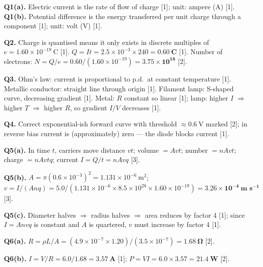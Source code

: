 \begin{markscheme}

\textbf{Q1(a).} Electric current is the rate of flow of charge [1]; unit: ampere (A) [1].\\
\textbf{Q1(b).} Potential difference is the energy transferred per unit charge through a component [1]; unit: volt (V) [1].

\vspace{0.5em}\textbf{Q2.} Charge is quantised means it only exists in discrete multiples of $e = 1.60\times10^{-19}\ \text{C}$ [1]. $Q = It = 2.5\times10^{-3} \times 240 = \mathbf{0.60\ \text{C}}$ [1]. Number of electrons: $N = Q/e = 0.60/(1.60\times10^{-19}) = \mathbf{3.75\times10^{18}}$ [2].

\vspace{0.5em}\textbf{Q3.} Ohm's law: current is proportional to p.d.\ at constant temperature [1]. Metallic conductor: straight line through origin [1]. Filament lamp: S-shaped curve, decreasing gradient [1]. Metal: $R$ constant so linear [1]; lamp: higher $I$ $\Rightarrow$ higher $T$ $\Rightarrow$ higher $R$, so gradient $I/V$ decreases [1].

\vspace{0.5em}\textbf{Q4.} Correct exponential-ish forward curve with threshold $\approx 0.6\ \text{V}$ marked [2]; in reverse bias current is (approximately) zero — the diode blocks current [1].

\vspace{0.5em}\textbf{Q5(a).} In time $t$, carriers move distance $vt$; volume $= Avt$; number $= nAvt$; charge $= nAvtq$; current $I = Q/t = nAvq$ [3].

\vspace{0.5em}\textbf{Q5(b).} $A = \pi(0.6\times10^{-3})^2 = 1.131\times10^{-6}\ \text{m}^2$; $v = I/(Anq) = 5.0/(1.131\times10^{-6} \times 8.5\times10^{28} \times 1.60\times10^{-19}) = \mathbf{3.26\times10^{-4}\ \text{m s}^{-1}}$ [3].

\vspace{0.5em}\textbf{Q5(c).} Diameter halves $\Rightarrow$ radius halves $\Rightarrow$ area reduces by factor 4 [1]; since $I = Anvq$ is constant and $A$ is quartered, $v$ must increase by factor 4 [1].

\vspace{0.5em}\textbf{Q6(a).} $R = \rho L/A = (4.9\times10^{-7} \times 1.20)/(3.5\times10^{-7}) = \mathbf{1.68\ \Omega}$ [2].

\vspace{0.5em}\textbf{Q6(b).} $I = V/R = 6.0/1.68 = \mathbf{3.57\ \text{A}}$ [1]; $P = VI = 6.0\times3.57 = \mathbf{21.4\ \text{W}}$ [2].


\end{markscheme}
